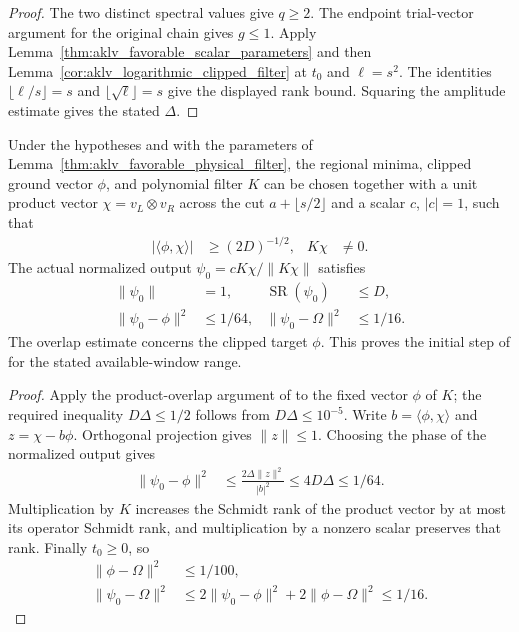 \begin{proof}
    \leanok
    The two distinct spectral values give $q\ge2$. The endpoint trial-vector
    argument for the original chain gives $g\le1$.
    Apply Lemma~\ref{thm:aklv_favorable_scalar_parameters} and then
    Lemma~\ref{cor:aklv_logarithmic_clipped_filter} at $t_0$ and
    $\ell=s^2$. The identities $\lfloor\ell/s\rfloor=s$ and
    $\lfloor\sqrt\ell\rfloor=s$ give the displayed rank bound.
    Squaring the amplitude estimate gives the stated $\Delta$.
\end{proof}

\begin{lemma}
    \label{thm:aklv_physical_product_initialization}
    \leanok
    Under the hypotheses and with the parameters of
    Lemma~\ref{thm:aklv_favorable_physical_filter}, the regional minima,
    clipped ground vector $\phi$, and polynomial filter $K$ can be chosen
    together with a unit product vector $\chi=v_L\otimes v_R$ across
    the cut $a+\lfloor s/2\rfloor$ and a scalar $c$, $|c|=1$, such that
    \begin{align*}
        |\langle\phi,\chi\rangle| & \ge(2D)^{-1/2}, & K\chi & \ne0.
    \end{align*}
    The actual normalized output $\psi_0=cK\chi/\|K\chi\|$ satisfies
    \begin{align*}
        \|\psi_0\|          & =1,      & \operatorname{SR}(\psi_0) & \le D, \\
        \|\psi_0-\phi\|^2   & \le1/64, &
        \|\psi_0-\Omega\|^2 & \le1/16.
    \end{align*}
    The overlap estimate concerns the clipped target $\phi$.
    This proves the initial step of \cite[Lemma~6.3]{Arad2013AreaLaw}
    for the stated available-window range.
\end{lemma}
\begin{proof}
    \leanok
    Apply the product-overlap argument of
    \cite[Lemma~2.2]{Arad2013AreaLaw} to the fixed vector $\phi$ of $K$;
    the required inequality $D\Delta\le1/2$ follows from
    $D\Delta\le10^{-5}$. Write $b=\langle\phi,\chi\rangle$ and
    $z=\chi-b\phi$. Orthogonal projection gives $\|z\|\le1$.
    Choosing the phase of the normalized output gives
    \begin{align*}
        \|\psi_0-\phi\|^2
         & \le\frac{2\Delta\|z\|^2}{|b|^2}
        \le4D\Delta\le1/64.
    \end{align*}
    Multiplication by $K$ increases the Schmidt rank of the product vector
    by at most its operator Schmidt rank, and multiplication by a nonzero
    scalar preserves that rank. Finally $t_0\ge0$, so
    \begin{align*}
        \|\phi-\Omega\|^2 & \le1/100,                                        \\
        \|\psi_0-\Omega\|^2
                          & \le2\|\psi_0-\phi\|^2+2\|\phi-\Omega\|^2\le1/16.
    \end{align*}
\end{proof}
